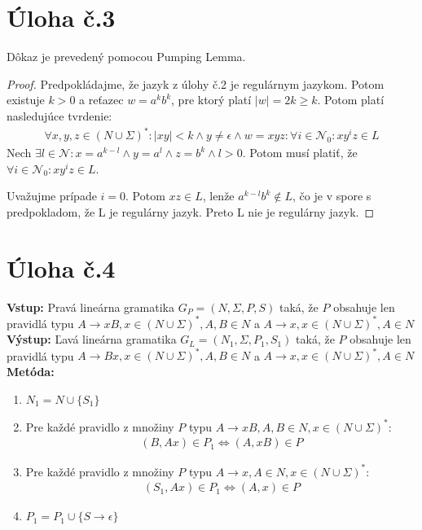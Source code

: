 \documentclass[10pt]{article}
\begin{document}
\section*{Úloha č.3}
Dôkaz je prevedený pomocou Pumping Lemma. 
\begin{proof}
Predpokládajme, že jazyk z úlohy č.2 je regulárnym jazykom. Potom existuje $k > 0$ a reťazec $w =
a^kb^k$, pre ktorý platí $|w| = 2k \geq k$. Potom platí nasledujúce tvrdenie:
\begin{align*}
    \forall x,y,z \in (N \cup \Sigma)^*: |xy| < k \land y \neq \epsilon \land w = xyz: \forall i \in
    \mathcal{N}_0: xy^iz \in L 
\end{align*}
    Nech $\exists l\in \mathcal{N}: x = a^{k-l} \land y = a^{l} \land z = b^k \land l > 0$. Potom musí platiť, že $\forall
i \in \mathcal{N}_0: xy^iz \in L$.

Uvažujme prípade $i = 0$. Potom $xz \in L$, lenže $a^{k-l}b^k \notin L$, čo je v spore s
predpokladom, že L je regulárny jazyk. Preto L nie je regulárny jazyk.
\end{proof}


\section*{Úloha č.4}

\textbf{Vstup:} Pravá lineárna gramatika $G_P = (N, \Sigma, P, S)$ taká, že $P$ obsahuje len pravidlá typu
$A\to xB, x \in (N\cup\Sigma)^*, A,B \in N$ a $A\to x, x \in (N\cup\Sigma)^*, A \in N$\\
\textbf{Výstup:} Ľavá lineárna gramatika $G_L = (N_1, \Sigma, P_1, S_1)$ taká, že $P$ obsahuje len pravidlá typu
$A\to Bx, x \in (N\cup\Sigma)^*, A,B \in N$ a $A\to x, x \in (N\cup\Sigma)^*, A \in N$\\
\textbf{Metóda:}
\begin{enumerate}
    \item $N_1 = N \cup \{S_1\}$
    \item Pre každé pravidlo z množiny $P$ typu $A\to xB, A,B \in N, x \in (N\cup\Sigma)^*$:\\
        \begin{align*}
            (B,Ax) \in P_1 \iff (A, xB) \in P
        \end{align*}
    \item Pre každé pravidlo z množiny $P$ typu $A\to x, A \in N, x \in (N\cup\Sigma)^*$:\\
        \begin{align*}
            (S_1,Ax) \in P_1 \iff (A, x) \in P
        \end{align*}
    \item $P_1 = P_1 \cup \{S\to\epsilon\}$
\end{enumerate}
\end{document}
